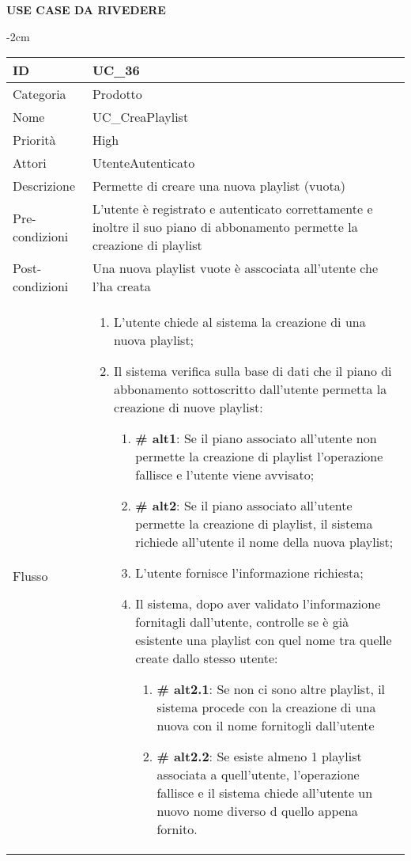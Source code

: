 \begin{center}

\textbf{USE CASE DA RIVEDERE} \newline

\begin{table}[bp]
    \centering
    \addtolength{\leftskip} {-2cm}
\begin{tabular}{ |p{2.6cm}|p{13cm}|  }
\hline
ID & UC\_36 \\\hline
Categoria & Prodotto \\\hline
Nome & UC\_CreaPlaylist\\\hline
Priorità & High \\\hline
Attori &  UtenteAutenticato \\\hline
Descrizione & Permette di creare una nuova playlist (vuota)\\\hline
Pre-condizioni & L'utente è registrato e autenticato correttamente e inoltre il suo piano di abbonamento permette la creazione di playlist\\\hline
Post-condizioni & Una nuova playlist vuote è asscociata all'utente che l'ha creata\\\hline
Flusso &  	\begin{enumerate}
\item L'utente chiede al sistema la creazione di una nuova playlist;
		\item Il sistema verifica sulla base di dati che il piano di abbonamento sottoscritto dall'utente permetta la creazione di nuove playlist:
		 \begin{enumerate}[label*=\arabic*.]
			\item \textbf{\# alt1}: Se il piano associato all'utente non permette la creazione di playlist l'operazione fallisce e l'utente viene avvisato;
			\item \textbf{\# alt2}: Se il piano associato all'utente permette la creazione di playlist, il sistema richiede all'utente il nome della nuova playlist;
			\item L'utente fornisce l'informazione richiesta;
			\item Il sistema, dopo aver validato l'informazione fornitagli dall'utente, controlle se è già esistente una playlist con quel nome tra quelle create dallo stesso utente:
			\begin{enumerate}[label*=\arabic*.]
				\item \textbf{\# alt2.1}: Se non ci sono altre playlist, il sistema procede con la creazione di una nuova con il nome fornitogli dall'utente
				\item \textbf{\# alt2.2}: Se esiste almeno 1 playlist associata a quell'utente, l'operazione fallisce e il sistema chiede all'utente un nuovo nome diverso d quello appena fornito.
			\end{enumerate}
					\end{enumerate}


\end{enumerate}
\end{tabular}
\end{table}
\end{center}
